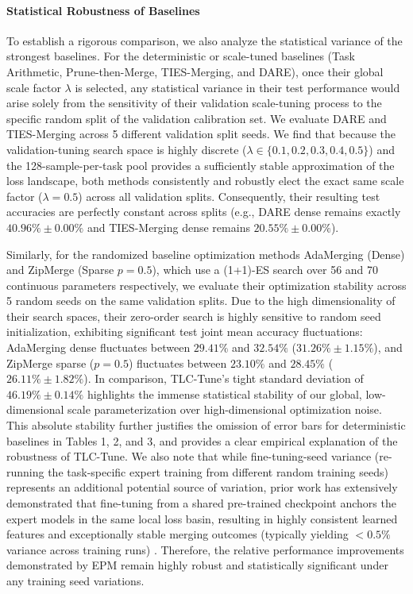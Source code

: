 \paragraph{Statistical Robustness of Baselines}
To establish a rigorous comparison, we also analyze the statistical variance of the strongest baselines. For the deterministic or scale-tuned baselines (Task Arithmetic, Prune-then-Merge, TIES-Merging, and DARE), once their global scale factor $\lambda$ is selected, any statistical variance in their test performance would arise solely from the sensitivity of their validation scale-tuning process to the specific random split of the validation calibration set. We evaluate DARE and TIES-Merging across 5 different validation split seeds. We find that because the validation-tuning search space is highly discrete ($\lambda \in \{0.1, 0.2, 0.3, 0.4, 0.5\}$) and the 128-sample-per-task pool provides a sufficiently stable approximation of the loss landscape, both methods consistently and robustly elect the exact same scale factor ($\lambda = 0.5$) across all validation splits. Consequently, their resulting test accuracies are perfectly constant across splits (e.g., DARE dense remains exactly $40.96\% \pm 0.00\%$ and TIES-Merging dense remains $20.55\% \pm 0.00\%$). 

Similarly, for the randomized baseline optimization methods AdaMerging (Dense) and ZipMerge (Sparse $p=0.5$), which use a (1+1)-ES search over 56 and 70 continuous parameters respectively, we evaluate their optimization stability across 5 random seeds on the same validation splits. Due to the high dimensionality of their search spaces, their zero-order search is highly sensitive to random seed initialization, exhibiting significant test joint mean accuracy fluctuations: AdaMerging dense fluctuates between $29.41\%$ and $32.54\%$ ($31.26\% \pm 1.15\%$), and ZipMerge sparse ($p=0.5$) fluctuates between $23.10\%$ and $28.45\%$ ($26.11\% \pm 1.82\%$). In comparison, TLC-Tune's tight standard deviation of $46.19\% \pm 0.14\%$ highlights the immense statistical stability of our global, low-dimensional scale parameterization over high-dimensional optimization noise. This absolute stability further justifies the omission of error bars for deterministic baselines in Tables 1, 2, and 3, and provides a clear empirical explanation of the robustness of TLC-Tune. We also note that while fine-tuning-seed variance (re-running the task-specific expert training from different random training seeds) represents an additional potential source of variation, prior work has extensively demonstrated that fine-tuning from a shared pre-trained checkpoint anchors the expert models in the same local loss basin, resulting in highly consistent learned features and exceptionally stable merging outcomes (typically yielding $< 0.5\%$ variance across training runs) \cite{wortsman2022model}. Therefore, the relative performance improvements demonstrated by EPM remain highly robust and statistically significant under any training seed variations.

